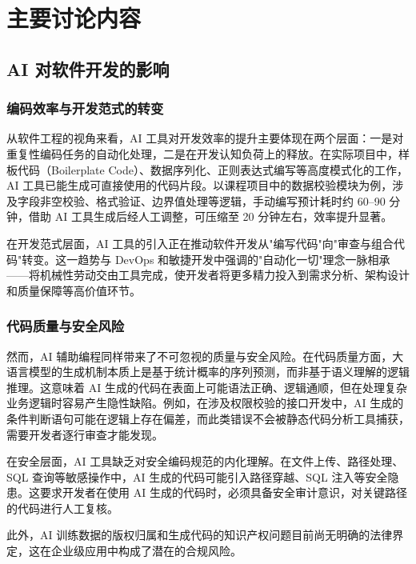 \documentclass[12pt,a4paper]{article}
\begin{document}
\section{主要讨论内容}

\subsection{AI 对软件开发的影响}

\subsubsection{编码效率与开发范式的转变}

从软件工程的视角来看，AI 工具对开发效率的提升主要体现在两个层面：一是对重复性编码任务的自动化处理，二是在开发认知负荷上的释放。在实际项目中，样板代码（Boilerplate Code）、数据序列化、正则表达式编写等高度模式化的工作，AI 工具已能生成可直接使用的代码片段。以课程项目中的数据校验模块为例，涉及字段非空校验、格式验证、边界值处理等逻辑，手动编写预计耗时约 60--90 分钟，借助 AI 工具生成后经人工调整，可压缩至 20 分钟左右，效率提升显著。

在开发范式层面，AI 工具的引入正在推动软件开发从"编写代码"向"审查与组合代码"转变。这一趋势与 DevOps 和敏捷开发中强调的"自动化一切"理念一脉相承——将机械性劳动交由工具完成，使开发者将更多精力投入到需求分析、架构设计和质量保障等高价值环节。

\subsubsection{代码质量与安全风险}

然而，AI 辅助编程同样带来了不可忽视的质量与安全风险。在代码质量方面，大语言模型的生成机制本质上是基于统计概率的序列预测，而非基于语义理解的逻辑推理。这意味着 AI 生成的代码在表面上可能语法正确、逻辑通顺，但在处理复杂业务逻辑时容易产生隐性缺陷。例如，在涉及权限校验的接口开发中，AI 生成的条件判断语句可能在逻辑上存在偏差，而此类错误不会被静态代码分析工具捕获，需要开发者逐行审查才能发现。

在安全层面，AI 工具缺乏对安全编码规范的内化理解。在文件上传、路径处理、SQL 查询等敏感操作中，AI 生成的代码可能引入路径穿越、SQL 注入等安全隐患。这要求开发者在使用 AI 生成的代码时，必须具备安全审计意识，对关键路径的代码进行人工复核。

此外，AI 训练数据的版权归属和生成代码的知识产权问题目前尚无明确的法律界定，这在企业级应用中构成了潜在的合规风险。
\end{document}
